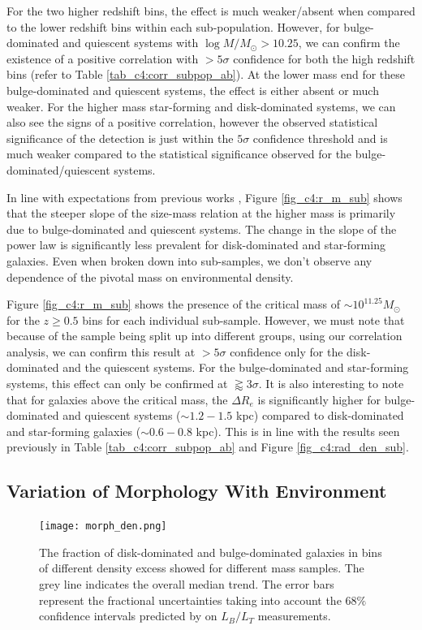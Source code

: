 For the two higher redshift bins, the effect is much weaker/absent when compared to the lower redshift bins within each sub-population. However, for bulge-dominated and quiescent systems with $\log M/M_{\odot} > 10.25$, we can confirm the existence of a positive correlation with $>5\sigma$ confidence for both the high redshift bins (refer to Table \ref{tab_c4:corr_subpop_ab}). At the lower mass end for these bulge-dominated and quiescent systems, the effect is either absent or much weaker. For the higher mass star-forming and disk-dominated systems, we can also see the signs of a positive correlation, however the observed statistical significance of the detection is just within the $5\sigma$ confidence threshold and is much weaker compared to the statistical significance observed for the bulge-dominated/quiescent systems.

In line with expectations from previous works \citep[e.g.,][]{mowla19, hsc_mass_size}, Figure \ref{fig_c4:r_m_sub} shows that the steeper slope of the size-mass relation at the higher mass is primarily due to bulge-dominated and quiescent systems. The change in the slope of the power law is significantly less prevalent for disk-dominated and star-forming galaxies. Even when broken down into sub-samples, we don't observe any dependence of the pivotal mass on environmental density.

Figure \ref{fig_c4:r_m_sub} shows the presence of the critical mass of $\sim 10^{11.25}M_{\odot}$ for the $z \geq 0.5$ bins for each individual sub-sample. However, we must note that because of the sample being split up into different groups, using our correlation analysis, we can confirm this result at $>5\sigma$ confidence only for the disk-dominated and the quiescent systems. For the bulge-dominated and star-forming systems, this effect can only be confirmed at $\gtrapprox3\sigma$. It is also interesting to note that for galaxies above the critical mass, the $\Delta R_e$ is significantly higher for bulge-dominated and quiescent systems ($\sim1.2-1.5$ kpc) compared to disk-dominated and star-forming galaxies ($\sim0.6-0.8$ kpc). This is in line with the results seen previously in Table \ref{tab_c4:corr_subpop_ab} and Figure \ref{fig_c4:rad_den_sub}. 

\subsection{Variation of Morphology With Environment} \label{sec_c4:morph_env}

\begin{figure}[htb]
    \centering
    \texttt{[image: morph\_den.png]}
    \caption{The fraction of disk-dominated and bulge-dominated galaxies in bins of different density excess showed for different mass samples. The grey line indicates the overall median trend. The error bars represent the fractional uncertainties taking into account the $68\%$ confidence intervals predicted by \gampen{} on $L_B/L_T$ measurements.}
    \label{fig_c4:morph_den}
\end{figure}

